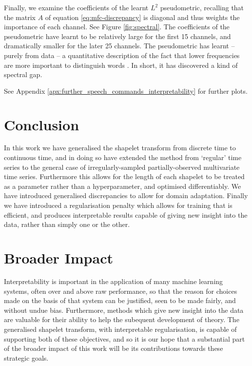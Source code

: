 \documentclass{article}
\theoremstyle{plain}
\theoremstyle{definition}
\begin{document}
Finally, we examine the coefficients of the learnt $L^2$ pseudometric, recalling that the matrix $A$ of equation \eqref{eq:mfc-discrepancy} is diagonal and thus weights the importance of each channel. See Figure \ref{fig:spectral}. The coefficients of the pseudometric have learnt to be relatively large for the first 15 channels, and dramatically smaller for the later 25 channels. The pseudometric has learnt -- purely from data -- a quantitative description of the fact that lower frequencies are more important to distinguish words \cite{monson2019maximum}. In short, it has discovered a kind of spectral gap. 

See Appendix \ref{apx:further_speech_commands_interpretability} for further plots.




	\section{Conclusion}
	In this work we have generalised the shapelet transform from discrete time to continuous time, and in doing so have extended the method from `regular' time series to the general case of irregularly-sampled partially-observed multivariate time series. Furthermore this allows for the length of each shapelet to be treated as a parameter rather than a hyperparameter, and optimised differentiably. We have introduced generalised discrepancies to allow for domain adaptation. Finally we have introduced a regularisation penalty which allows for training that is efficient, and produces interpretable results capable of giving new insight into the data, rather than simply one or the other.
	
	\section*{Broader Impact}
	Interpretability is important in the application of many machine learning systems, often over and above raw performance, so that the reason for choices made on the basis of that system can be justified, seen to be made fairly, and without undue bias. Furthermore, methods which give new insight into the data are valuable for their ability to help the subequent development of theory. The generalised shapelet transform, with interpretable regularisation, is capable of supporting both of these objectives, and so it is our hope that a substantial part of the broader impact of this work will be its contributions towards these strategic goals.
	
\end{document}
